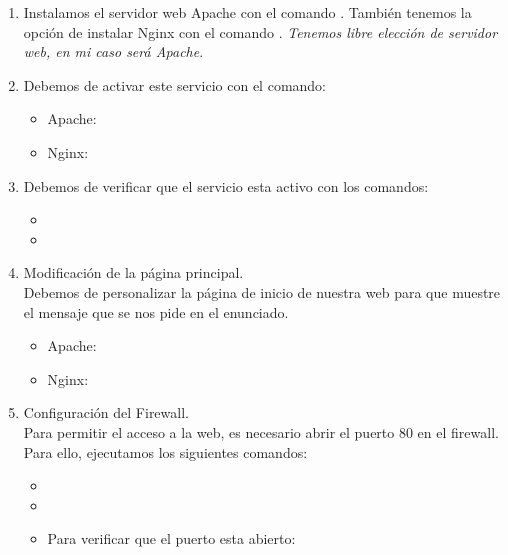 \begin{enumerate}
  \item Instalamos el servidor web Apache con el comando . También tenemos la opción de instalar Nginx con el comando . \textit{Tenemos libre elección de servidor web, en mi caso será Apache}.
  \item Debemos de activar este servicio con el comando:
  \begin{itemize}
    \item Apache: 
    \item Nginx: 
  \end{itemize}
  \item Debemos de verificar que el servicio esta activo con los comandos:
  \begin{itemize}
    \item {}
    \item {}
  \end{itemize}
  \item Modificación de la página principal.\\
  Debemos de personalizar la página de inicio de nuestra web para que muestre el mensaje que se nos pide en el enunciado.
  \begin{itemize}
    \item Apache: 
    \item Nginx: 
  \end{itemize}
  \item Configuración del Firewall.\\
  Para permitir el acceso a la web, es necesario abrir el puerto 80 en el firewall. Para ello, ejecutamos los siguientes comandos:
  \begin{itemize}
    \item {}
    \item {}
    \item Para verificar que el puerto esta abierto: 
  \end{itemize}

\end{enumerate}
